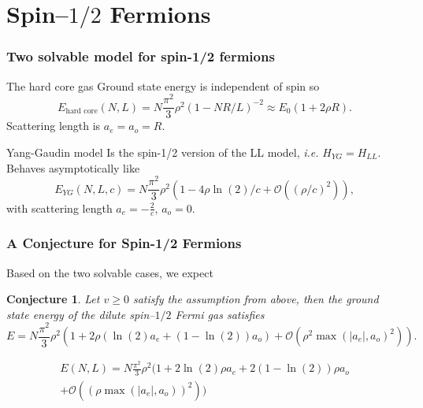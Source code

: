 \documentclass{beamer}[10]
\newcommand{\abs}[1]{\left\lvert #1 \right\rvert}
\newcommand{\ie}{\emph{i.e.} }
\newtheorem{mconjecture}{Conjecture}
\begin{document}
\section{Spin--$1/2$ Fermions}
\begin{frame}
	\frametitle{Two solvable model for spin-1/2 fermions}
	\vspace*{-0.4cm}
	\begin{block}{The hard core gas}
		Ground state energy is independent of spin
		so \begin{equation}
		E_{\text{hard core}}(N,L)=N\frac{\pi^2}{3}\rho^2 (1-NR/L)^{-2}\approx E_0(1+2\rho R).
		\end{equation}
		Scattering length is $ a_e=a_o=R $.
	\end{block}
	\begin{block}{Yang-Gaudin model}
		Is the spin-1/2 version of the LL model, \ie $ H_{YG}=H_{LL} $.
		 Behaves asymptotically like
		 \begin{equation}
		 E_{YG}(N,L,c)=N\frac{\pi^2}{3}\rho^2\left(1-4\rho\ln(2)/c+\mathcal{O}\left((\rho/c)^2\right)\right),
		 \end{equation}
		 with scattering length $ a_e=-\frac{2}{c} $, $ a_o=0 $.
		\end{block}
\end{frame}

\begin{frame}
	\frametitle{A Conjecture for Spin-1/2 Fermions}
	\small
	Based on the two solvable cases, we expect
	\begin{mconjecture}\label{ConjectureEqCSpin1/2FermiGroundStateEnergy}
		Let $ v\geq0 $ satisfy the assumption from above, then the ground state energy of the dilute spin--$ 1/2 $ Fermi gas satisfies\begin{equation}\label{EqConjectureEqCSpin1/2FermiGroundStateEnergy}
			E=N\frac{\pi^2}{3}\rho^2\left(1+2\rho \left(\ln(2) a_e+(1-\ln(2))a_o\right)+\mathcal{O}(\rho^2\max(\abs{a_e},a_o)^2)\right).
		\end{equation}
	\end{mconjecture}
	
	 \small\begin{equation}
	\begin{aligned}
	E(N,L)=N\frac{\pi^2}{3}\rho^2\Big(1+2\ln(2)\rho a_e+2(1-\ln(2))\rho a_o\\+\mathcal{O}\left((\rho\max(\abs{a_e},a_o))^2\right)\Big)
	\end{aligned}
	\end{equation}
\end{frame}
\end{document}

